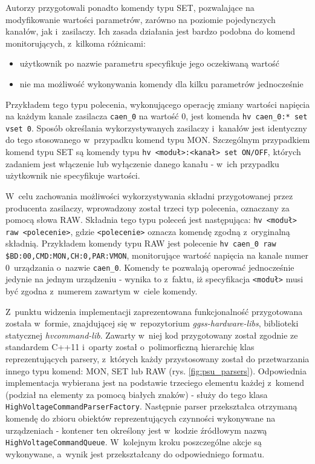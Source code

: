 Autorzy przygotowali ponadto komendy typu SET, pozwalające na modyfikowanie wartości parametrów, zarówno na poziomie pojedynczych kanałów, jak i~zasilaczy. Ich zasada działania jest bardzo podobna do komend monitorujących, z~kilkoma różnicami:
\begin{itemize}
    \item użytkownik po nazwie parametru specyfikuje jego oczekiwaną wartość
    \item nie ma możliwość wykonywania komendy dla kilku parametrów jednocześnie
\end{itemize}
Przykładem tego typu polecenia, wykonującego operację zmiany wartości napięcia na każdym kanale zasilacza \lstinline{caen_0} na wartość 0, jest komenda \lstinline{hv caen_0:* set vset 0}. Sposób określania wykorzystywanych zasilaczy i~kanałów jest identyczny do tego stosowanego w~przypadku komend typu MON. Szczególnym przypadkiem komend typu SET są komendy typu \lstinline{hv <moduł>:<kanał> set ON/OFF}, których zadaniem jest włączenie lub wyłączenie danego kanału - w~ich przypadku użytkownik nie specyfikuje wartości.

W~celu zachowania możliwości wykorzystywania składni przygotowanej przez producenta zasilaczy, wprowadzony został trzeci typ polecenia, oznaczany za pomocą słowa RAW. Składnia tego typu poleceń jest następująca: \lstinline{hv <moduł> raw <polecenie>}, gdzie \lstinline{<polecenie>} oznacza komendę zgodną z~oryginalną składnią. Przykładem komendy typu RAW jest polecenie \lstinline{hv caen_0 raw $BD:00,CMD:MON,CH:0,PAR:VMON}, monitorujące wartość napięcia na kanale numer 0~urządzania o~nazwie \lstinline{caen_0}. Komendy te pozwalają operować jednocześnie jedynie na jednym urządzeniu - wynika to z~faktu, iż specyfikacja \lstinline{<moduł>} musi być zgodna z~numerem zawartym w~ciele komendy.

Z~punktu widzenia implementacji zaprezentowana funkcjonalność przygotowana została w~formie, znajdującej się w~repozytorium \emph{ggss-hardware-libs}, biblioteki statycznej \emph{hvcommand-lib}. Zawarty w~niej kod przygotowany został zgodnie ze standardem C++11 i~oparty został o~polimorficzną hierarchię klas reprezentujących parsery, z~których każdy przystosowany został do przetwarzania innego typu komend: MON, SET lub RAW (rys. \ref{fig:psu_parsers}). Odpowiednia implementacja wybierana jest na podstawie trzeciego elementu każdej z~komend (podział na elementy za pomocą białych znaków) - służy do tego klasa \lstinline{HighVoltageCommandParserFactory}. Następnie parser przekształca otrzymaną komendę do zbioru obiektów reprezentujących czynności wykonywane na urządzeniach - kontener ten określony jest w~kodzie źródłowym nazwą \lstinline{HighVoltageCommandQueue}. W~kolejnym kroku poszczególne akcje są wykonywane, a~wynik jest przekształcany do odpowiedniego formatu.

